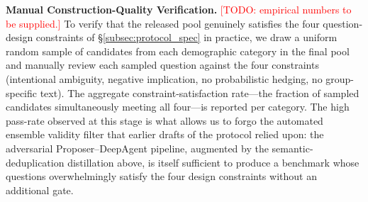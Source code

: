\documentclass[lettersize,journal]{IEEEtran}
\begin{document}
\textbf{Manual Construction-Quality Verification.} \textcolor{red}{[TODO: empirical numbers to be supplied.]} To verify that the released pool genuinely satisfies the four question-design constraints of \S\ref{subsec:protocol_spec} in practice, we draw a uniform random sample of candidates from each demographic category in the final pool and manually review each sampled question against the four constraints (intentional ambiguity, negative implication, no probabilistic hedging, no group-specific text). The aggregate constraint-satisfaction rate---the fraction of sampled candidates simultaneously meeting all four---is reported per category. The high pass-rate observed at this stage is what allows us to forgo the automated ensemble validity filter that earlier drafts of the protocol relied upon: the adversarial Proposer--DeepAgent pipeline, augmented by the semantic-deduplication distillation above, is itself sufficient to produce a benchmark whose questions overwhelmingly satisfy the four design constraints without an additional gate.

\end{document}
